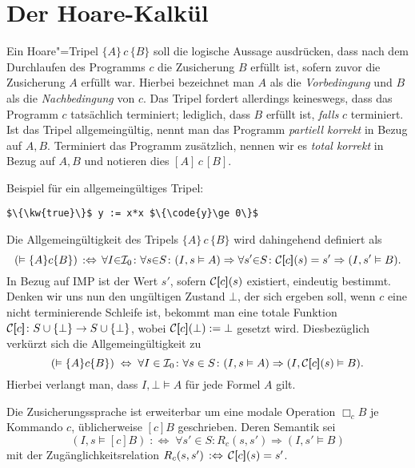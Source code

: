 \section{Der Hoare-Kalkül}

Ein Hoare"=Tripel $\{A\}\,c\,\{B\}$ soll die logische
Aussage ausdrücken, dass nach dem Durchlaufen des Programms $c$ die Zusicherung
$B$ erfüllt ist, sofern zuvor die Zusicherung $A$ erfüllt war. Hierbei
bezeichnet man $A$ als die \emph{Vorbedingung} und $B$
als die \emph{Nachbedingung} von $c$. Das Tripel fordert
allerdings keineswegs, dass das Programm $c$ tatsächlich terminiert; lediglich,
dass $B$ erfüllt ist, \emph{falls} $c$ terminiert. Ist das Tripel allgemeingültig,
nennt man das Programm \emph{partiell korrekt}
in Bezug auf $A,B$. Terminiert das Programm zusätzlich, nennen wir es
\emph{total korrekt} in Bezug auf $A,B$ und
notieren dies $[A]\,c\,[B]$.

Beispiel für ein allgemeingültiges Tripel:

\begin{lstlisting}[language=IMP, xleftmargin=\mathindent, mathescape]
$\{\kw{true}\}$ y := x*x $\{\code{y}\ge 0\}$
\end{lstlisting}

\noindent
Die Allgemeingültigkeit des Tripels $\{A\}\,c\,\{B\}$ wird dahingehend
definiert als%
\[(\vDash\{A\}c \{B\}) \,:\Leftrightarrow\, \forall I{\in}\mathcal I_0\colon\forall s{\in}S\colon
(I,s\vDash A)\Rightarrow\forall s'{\in}S\colon \mathcal C[\hspace{-2.6pt}[c]\hspace{-2.4pt}](s)=s'\Rightarrow (I,s'\vDash B).\]
 In Bezug auf IMP ist der Wert $s'$, sofern $\mathcal C[\hspace{-2.6pt}[c]\hspace{-2.4pt}](s)$ existiert,
eindeutig bestimmt. Denken wir uns nun den ungültigen Zustand $\bot$,
der sich ergeben soll, wenn $c$ eine nicht terminierende Schleife ist,
bekommt man eine totale Funktion $\mathcal C[\hspace{-2.6pt}[c]\hspace{-2.4pt}]\colon S\cup\{\bot\}\to S\cup\{\bot\}$,
wobei $\mathcal C[\hspace{-2.6pt}[c]\hspace{-2.4pt}](\bot):=\bot$ gesetzt wird. Diesbezüglich verkürzt sich
die Allgemeingültigkeit zu%
\[(\vDash\{A\}c \{B\}) \;\Leftrightarrow\; \forall I\in\mathcal I_0\colon\forall s\in S\colon
(I,s\vDash A)\Rightarrow (I,\mathcal C[\hspace{-2.6pt}[c]\hspace{-2.4pt}](s)\vDash B).\]
Hierbei verlangt man, dass $I,\bot\models A$ für jede Formel $A$ gilt.

Die Zusicherungssprache ist erweiterbar um eine modale Operation
$\Box_c B$ je Kommando $c$, üblicherweise $[c]B$ geschrieben. Deren Semantik sei
\[(I,s\models [c]B) \;:\Leftrightarrow\; \forall s'\in S\colon R_c(s,s')\Rightarrow (I,s'\models B)\]
mit der Zugänglichkeitsrelation $R_c(s,s')\,:\Leftrightarrow\, \mathcal C[\hspace{-2.6pt}[c]\hspace{-2.4pt}](s)=s'$.

